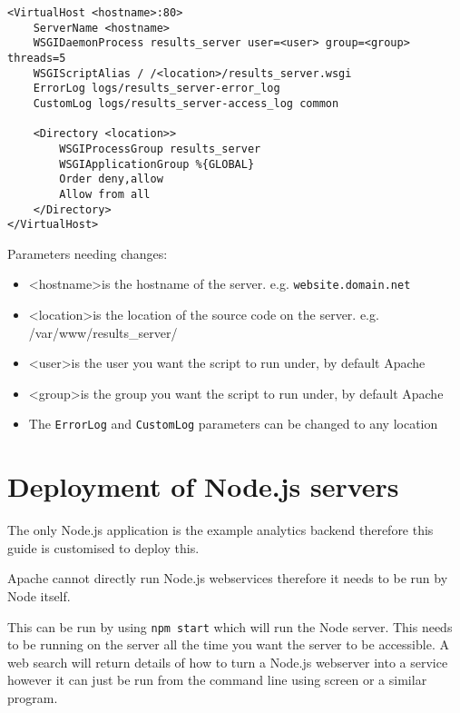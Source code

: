 \begin{lstlisting}[caption={Apache configuration}, label={code:apacheConfig_flask}]
<VirtualHost <hostname>:80>
	ServerName <hostname>
	WSGIDaemonProcess results_server user=<user> group=<group> threads=5
	WSGIScriptAlias / /<location>/results_server.wsgi
	ErrorLog logs/results_server-error_log
	CustomLog logs/results_server-access_log common

	<Directory <location>>
		WSGIProcessGroup results_server
		WSGIApplicationGroup %{GLOBAL}
		Order deny,allow
		Allow from all
	</Directory>
</VirtualHost>
\end{lstlisting}

\newpage
Parameters needing changes:

\begin{itemize}
\item \textless hostname\textgreater is the hostname of the server. e.g. \lstinline|website.domain.net|
\item \textless location\textgreater is the location of the source code on the server. e.g. /var/www/results\_server/
\item \textless user\textgreater is the user you want the script to run under, by default Apache
\item \textless group\textgreater is the group you want the script to run under, by default Apache
\item The \lstinline|ErrorLog| and \lstinline|CustomLog| parameters can be changed to any location

\end{itemize}

\section{Deployment of Node.js servers} \label{Section:Deployment of Node.js servers}

The only Node.js application is the example analytics backend therefore this guide is customised to deploy this.

Apache cannot directly run Node.js webservices therefore it needs to be run by Node itself.

This can be run by using \lstinline|npm start| which will run the Node server. This needs to be running on the server all the time you want the server to be accessible.
A web search will return details of how to turn a Node.js webserver into a service however it can just be run from the command line using screen or a similar program.

